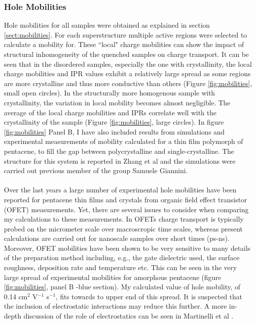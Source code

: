 \subsubsection{Hole Mobilities}
Hole mobilities for all samples were obtained as explained in section \ref{sect:mobilities}. For each superstructure multiple active regions were selected to calculate a mobility for. These ``local" charge mobilities can show the impact of structural inhomogeneity of the quenched samples on charge transport. It can be seen that in the disordered samples, especially the one with \mremove{$\sim$} crystallinity, the local charge mobilities and IPR values exhibit a relatively large spread as some regions are more crystalline and thus more conductive than others (Figure \ref{fig:mobilities}, small open circles). In the structurally more homogenous sample with  crystallinity, the variation in local mobility becomes almost negligible. The average of the local charge mobilities and IPRs correlate well with the crystallinity of the sample (Figure \ref{fig:mobilities}, large circles). In figure \ref{fig:mobilities} Panel B, I have also included results from simulations and experimental measurements of mobility calculated for a  thin film polymorph of pentacene, to fill the gap between polycrystalline and single-crystalline. The structure for this system is reported in Zhang et al \cite{Zhang2016TF} and the simulations were carried out  previous member of the group Samuele Giannini.
\\\\
Over the last  years a large number of experimental hole mobilities have been reported for pentacene thin films and crystals from organic field effect transistor (OFET) measurements. Yet, there are several issues to consider when comparing my calculations to these measurements. In OFETs charge transport is typically probed on the micrometer scale over macroscropic time scales, whereas present calculations are carried out for nanoscale samples over short times (ps-ns). Moreover, OFET mobilities have been shown to be very sensitive to many details of the preparation method including, e.g., the gate dielectric used, the surface roughness, deposition rate and temperature etc. This can be seen in the very large spread of experimental mobilities  for amorphous pentacene (figure \ref{fig:mobilities}, panel B -blue section). My calculated value of hole mobility, of 0.14 cm$^2$ V$^{-1}$ s$^{-1}$, fits towards to upper end of this spread. It is suspected that the inclusion of electrostatic interactions may reduce this further. A more in-depth discussion of the role of electrostatics can be seen in Martinelli et al \cite{ESEffectOnMob}.

